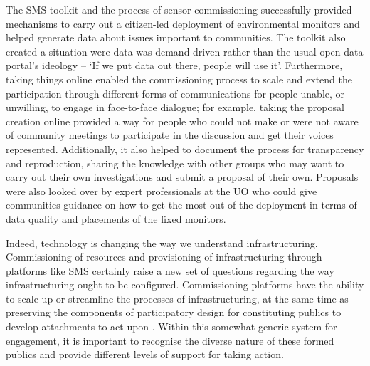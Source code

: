 The SMS toolkit and the process of sensor commissioning successfully provided mechanisms to carry out a citizen-led deployment of environmental monitors and helped generate data about issues important to communities. The toolkit also created a situation were data was demand-driven rather than the usual open data portal's ideology -- `If we put data out there, people will use it'. Furthermore, taking things online enabled the commissioning process to scale and extend the participation through different forms of communications for people unable, or unwilling, to engage in face-to-face dialogue; for example, taking the proposal creation online provided a way for people who could not make or were not aware of community meetings to participate in the discussion and get their voices represented. Additionally, it also helped to document the process for transparency and reproduction, sharing the knowledge with other groups who may want to carry out their own investigations and submit a proposal of their own. Proposals were also looked over by expert professionals at the UO who could give communities guidance on how to get the most out of the deployment in terms of data quality and placements of the fixed monitors.

Indeed, technology is changing the way we understand infrastructuring. Commissioning of resources and provisioning of infrastructuring through platforms like SMS certainly raise a new set of questions regarding the way infrastructuring ought to be configured. Commissioning platforms have the ability to scale up or streamline the processes of infrastructuring, at the same time as preserving the components of participatory design for constituting publics to develop attachments to act upon \citep{marres_issues_2007, dantec_infrastructuring_2013}. Within this somewhat generic system for engagement, it is important to recognise the diverse nature of these formed publics and provide different levels of support for taking action.

